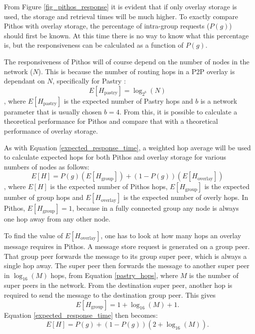\documentclass[10pt,a4paper,conference]{IEEEtran}
\begin{document}
From Figure \ref{fig_pithos_response} it is evident that if only overlay storage is used, the storage and retrieval times will be much higher. To
exactly compare Pithos with overlay storage, the percentage of intra-group requests ($P(g)$) should first be known. At this time there is no way to
know what this percentage is, but the responsiveness can be calculated as a function of $P(g)$.

The responsiveness of Pithos will of course depend on the number of nodes in the network ($N$). This is because the number of routing hops in a P2P
overlay is dependant on $N$, specifically for Pastry \cite{storage_and_chaching_PAST}:
%
\begin{equation}\label{pastry_hops}
    E[H_{\textrm{pastry}}] = \log_{2^b}\left(N\right)
\end{equation}
%
, where $E[H_{\textrm{pastry}}]$ is the expected number of Pastry hops and $b$ is a network parameter that is usually chosen $b = 4$. From this, it
is possible to calculate a theoretical performance for Pithos and compare that with a theoretical performance of overlay storage.

As with Equation \eqref{expected_response_time}, a weighted hop average will be used to calculate expected hops for both Pithos and overlay storage
for various numbers of nodes as follows:
%
\begin{equation}\label{expected_response_time}
    E[H] = P(g)\left(E\left[H_{\textrm{group}}\right]\right) + \left(1 - P(g)\right)\left(E\left[H_{\textrm{overlay}}\right]\right)
\end{equation}
%
, where $E[H]$ is the expected number of Pithos hops, $E\left[H_{\textrm{group}}\right]$ is the expected number of group hops and
$E\left[H_{\textrm{overlay}}\right]$ is the expected number of overly hops. In Pithos, $E\left[H_{\textrm{group}}\right] = 1$, because in a fully
connected group any node is always one hop away from any other node.

To find the value of $E\left[H_{\textrm{overlay}}\right]$, one has to look at how many hops an overlay message requires in Pithos. A message store
request is generated on a group peer. That group peer forwards the message to its group super peer, which is always a single hop away. The super peer
then forwards the message to another super peer in $\log_{16}(M)$ hops, from Equation \eqref{pastry_hops}, where $M$ is the number of super peers in
the network. From the destination super peer, another hop is required to send the message to the destination group peer. This gives
%
\begin{equation}\label{group_hops}
    E\left[H_{\textrm{group}}\right] = 1 + \log_{16}(M) + 1.
\end{equation}
%
Equation \eqref{expected_response_time} then becomes:
%
\begin{equation}\label{expected_response_time_exp}
    E[H] = P(g) + \left(1 - P(g)\right)\left(2 + \log_{16}\left(M\right)\right).
\end{equation}
\end{document}
